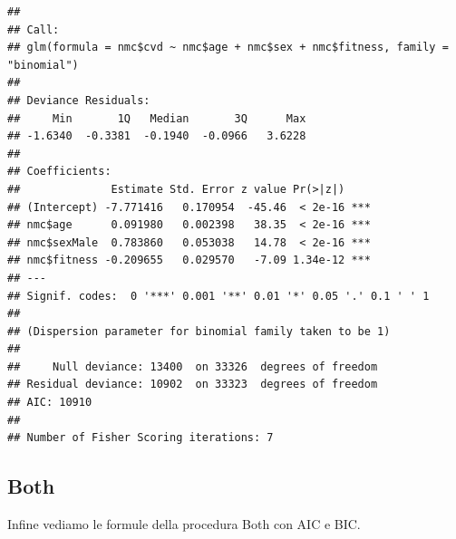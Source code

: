 \documentclass{article}\usepackage[]{graphicx}\usepackage[]{xcolor}
\makeatletter
\newenvironment{kframe}{%
 \def\at@end@of@kframe{}%
 \ifinner\ifhmode%
  \def\at@end@of@kframe{\end{minipage}}%
  \begin{minipage}{\columnwidth}%
 \fi\fi%
 \def\FrameCommand##1{\hskip\@totalleftmargin \hskip-\fboxsep
 \colorbox{shadecolor}{##1}\hskip-\fboxsep
     \hskip-\linewidth \hskip-\@totalleftmargin \hskip\columnwidth}%
 \MakeFramed {\advance\hsize-\width
   \@totalleftmargin\z@ \linewidth\hsize
   \@setminipage}}%
 {\par\unskip\endMakeFramed%
 \at@end@of@kframe}
\newenvironment{knitrout}{}{} %
\makeatother
\begin{document}
\begin{knitrout}
\begin{kframe}
\begin{verbatim}
## 
## Call:
## glm(formula = nmc$cvd ~ nmc$age + nmc$sex + nmc$fitness, family = "binomial")
## 
## Deviance Residuals: 
##     Min       1Q   Median       3Q      Max  
## -1.6340  -0.3381  -0.1940  -0.0966   3.6228  
## 
## Coefficients:
##              Estimate Std. Error z value Pr(>|z|)    
## (Intercept) -7.771416   0.170954  -45.46  < 2e-16 ***
## nmc$age      0.091980   0.002398   38.35  < 2e-16 ***
## nmc$sexMale  0.783860   0.053038   14.78  < 2e-16 ***
## nmc$fitness -0.209655   0.029570   -7.09 1.34e-12 ***
## ---
## Signif. codes:  0 '***' 0.001 '**' 0.01 '*' 0.05 '.' 0.1 ' ' 1
## 
## (Dispersion parameter for binomial family taken to be 1)
## 
##     Null deviance: 13400  on 33326  degrees of freedom
## Residual deviance: 10902  on 33323  degrees of freedom
## AIC: 10910
## 
## Number of Fisher Scoring iterations: 7
\end{verbatim}
\end{kframe}
\end{knitrout}
          
    \subsection{Both}
      Infine vediamo le formule della procedura Both con AIC e BIC.
\end{document}
